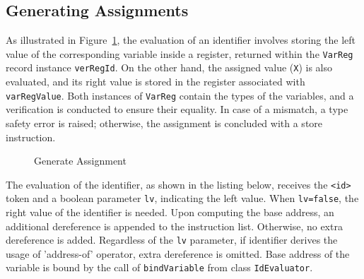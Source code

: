 \subsection{Generating Assignments}
As illustrated in Figure~\ref{fig:gen_assignment}, the evaluation of an identifier involves storing the left value of the corresponding variable inside a register,
returned within the \verb_VarReg_ record instance \verb+verRegId+.
On the other hand, the assigned value (\verb+X+) is also evaluated, and its right value is stored in the register associated with \verb+varRegValue+.
Both instances of \verb+VarReg+ contain the types of the variables, and a verification is conducted to ensure their equality.
In case of a mismatch, a type safety error is raised; otherwise, the assignment is concluded with a store instruction.
\begin{figure}[h]
\centering
{}
\caption{Generate Assignment}
\label{fig:gen_assignment}
\end{figure}

The evaluation of the identifier, as shown in the listing below, receives the
\verb+<id>+ token and a boolean parameter \verb+lv+, indicating the left value.
When \verb+lv=false+, the right value of the identifier is needed.
Upon computing the base address, an additional dereference is appended to the instruction list.
Otherwise, no extra dereference is added. Regardless of the \verb+lv+ parameter, if identifier
derives the usage of 'address-of' operator, extra dereference is omitted. Base address of the variable
is bound by the call of \verb+bindVariable+ from class \verb+IdEvaluator+.

